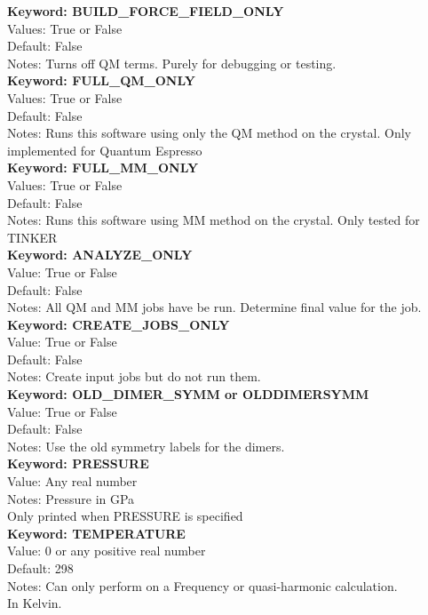 \documentclass[11pt,letterpaper]{article}
\begin{document}
\begin{spacing}{1.0}
\noindent 
\textbf{Keyword: BUILD\_FORCE\_FIELD\_ONLY} \\
Values:  True or False \\
Default: False \\
Notes:   Turns off QM terms.  Purely for debugging or testing. \\

\noindent
\textbf{Keyword: FULL\_QM\_ONLY} \\
Values:  True or False \\
Default: False\\
Notes:   Runs this software using only the QM method on the crystal. Only implemented for Quantum Espresso\\

\noindent
\textbf{Keyword: FULL\_MM\_ONLY} \\
Values:  True or False \\
Default: False\\
Notes:   Runs this software using MM method on the crystal. Only tested for TINKER\\

\noindent
\textbf{Keyword: ANALYZE\_ONLY}\\
Value: True or False\\
Default: False\\
Notes:   All QM and MM jobs have be run. Determine final value for the job.\\


\noindent
\textbf{Keyword: CREATE\_JOBS\_ONLY }\\
Value: True or False\\
Default: False\\
Notes:   Create input jobs but do not run them.\\

\noindent
\textbf{Keyword: OLD\_DIMER\_SYMM or OLDDIMERSYMM }\\
Value: True or False\\
Default: False\\
Notes:   Use the old symmetry labels for the dimers.\\

\noindent
\textbf{Keyword: PRESSURE}\\
Value: Any real number\\
Notes:   Pressure in GPa\\
              Only printed when PRESSURE is specified\\

\noindent
\textbf{Keyword: TEMPERATURE}\\
Value: 0 or any positive real number\\
Default: 298\\
Notes: Can only perform on a Frequency or quasi-harmonic calculation.\\
            In Kelvin.         \\  


\end{spacing}
\end{document}
